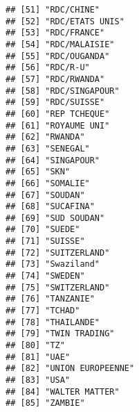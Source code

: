 \documentclass[
]{book}
\begin{document}
\begin{verbatim}
## [51] "RDC/CHINE"                               
## [52] "RDC/ETATS UNIS"                          
## [53] "RDC/FRANCE"                              
## [54] "RDC/MALAISIE"                            
## [55] "RDC/OUGANDA"                             
## [56] "RDC/R-U"                                 
## [57] "RDC/RWANDA"                              
## [58] "RDC/SINGAPOUR"                           
## [59] "RDC/SUISSE"                              
## [60] "REP TCHEQUE"                             
## [61] "ROYAUME UNI"                             
## [62] "RWANDA"                                  
## [63] "SENEGAL"                                 
## [64] "SINGAPOUR"                               
## [65] "SKN"                                     
## [66] "SOMALIE"                                 
## [67] "SOUDAN"                                  
## [68] "SUCAFINA"                                
## [69] "SUD SOUDAN"                              
## [70] "SUEDE"                                   
## [71] "SUISSE"                                  
## [72] "SUITZERLAND"                             
## [73] "Swaziland"                               
## [74] "SWEDEN"                                  
## [75] "SWITZERLAND"                             
## [76] "TANZANIE"                                
## [77] "TCHAD"                                   
## [78] "THAILANDE"                               
## [79] "TWIN TRADING"                            
## [80] "TZ"                                      
## [81] "UAE"                                     
## [82] "UNION EUROPEENNE"                        
## [83] "USA"                                     
## [84] "WALTER MATTER"                           
## [85] "ZAMBIE"
\end{verbatim}
\end{document}
